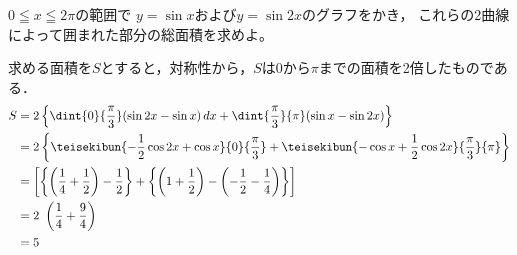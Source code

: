
\begin{problem}
  $0 \leqq x \leqq 2\pi$の範囲で
$y=\sin x$および$y=\sin2x$のグラフをかき，
これらの2曲線によって囲まれた部分の総面積を求めよ。
\end{problem}


求める面積を$S$とすると，対称性から，$S$は$0$から$\pi$までの面積を2倍したものである．
\begin{align*}
  S &= 2\left\{ \dint{0}{\frac{\pi}{3}}(\sin 2x - \sin x)\,dx
  + \dint{\frac{\pi}{3}}{\pi}(\sin x - \sin 2x) \right\} \\
  &= 2\left\{ \teisekibun{-\frac12\cos 2x + \cos x}{0}{\frac{\pi}{3}}
  + \teisekibun{-\cos x + \frac{1}{2}\cos 2x}{\frac{\pi}{3}}{\pi} \right\} \\
  &= \left[ \left\{ \left( \frac14 + \frac12 \right) - \frac12 \right\}
  + \left\{ \left( 1+\frac12 \right) - \left( -\frac12 - \frac14 \right) \right\}\right] \\
  &= 2\ \left( \frac14 + \frac94 \right) \\
  &= 5
\end{align*}

